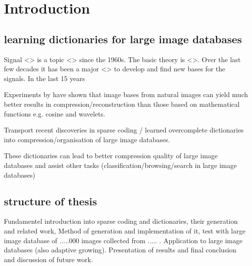 \chapter{Introduction}
\label{sec:introduction}
\section{learning dictionaries for large image databases}
Signal <> is a topic <> since the 1960s. The basic theory is <>. Over the last few decades it has been
a major <> to develop and find new bases for the signals. In the last 15 years 


Experiments by \cite{} have shown \cite{} that image bases from natural images can yield much better results in compression/reconstruction than
those based on mathematical functions e.g. cosine and wavelets.


\cite{Mairal2010}

Transport recent discoveries in sparse coding / learned overcomplete dictionaries into compression/organisation
of large image databases.

These dictionaries can lead to better compression quality of large image databases and assist other tasks (classification/browsing/search in large image databases)


\section{structure of thesis}
Fundamentel introduction into sparse coding and dictionaries, their generation and related work,
Method of generation and implementation of it, test with large image database of .....000 images collected from ..... .
Application to large image databases (also adaptive growing). Presentation of results and final conclusion and discussion of future work. 



